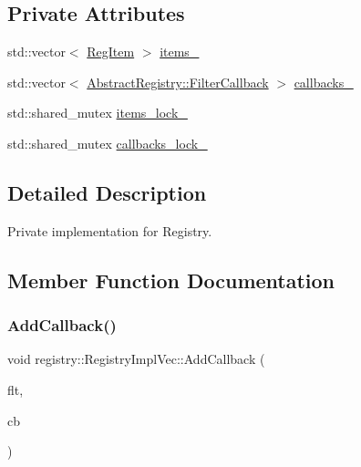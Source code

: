\subsection*{Private Attributes}
\begin{DoxyCompactItemize}
\item 
std\+::vector$<$ \hyperlink{classregistry_1_1RegItem}{Reg\+Item} $>$ \hyperlink{classregistry_1_1RegistryImplVec_a7aa61f3916c8e023d6c0f34e408e8718}{items\+\_\+}
\item 
std\+::vector$<$ \hyperlink{classregistry_1_1AbstractRegistry_a31f6bef634dcd324efebaf55f99b950f}{Abstract\+Registry\+::\+Filter\+Callback} $>$ \hyperlink{classregistry_1_1RegistryImplVec_ab2641b109d74e69bbd33ce6ce77a56f0}{callbacks\+\_\+}
\item 
std\+::shared\+\_\+mutex \hyperlink{classregistry_1_1RegistryImplVec_ab2b928d9a9d19ae0eaece3df7be8cf2a}{items\+\_\+lock\+\_\+}
\item 
std\+::shared\+\_\+mutex \hyperlink{classregistry_1_1RegistryImplVec_a840006fde132605002a8c6323c0ee647}{callbacks\+\_\+lock\+\_\+}
\end{DoxyCompactItemize}


\subsection{Detailed Description}
Private implementation for Registry. 

\subsection{Member Function Documentation}
\mbox{\label{classregistry_1_1RegistryImplVec_ae0fc63512abc9c7be1d281c69ee6f6c8}} 
\subsubsection{\texorpdfstring{Add\+Callback()}{AddCallback()}}
{\footnotesize\ttfamily void registry\+::\+Registry\+Impl\+Vec\+::\+Add\+Callback (\begin{DoxyParamCaption}\item[{\hyperlink{classregistry_1_1Filter}{Filter}}]{flt,  }\item[{\hyperlink{classregistry_1_1AbstractRegistry_a08a798ca9ca1c4c983ebd2386ca3c315}{Abstract\+Registry\+::\+Callback}}]{cb }\end{DoxyParamCaption})\hspace{0.3cm}{\ttfamily [inline]}}

